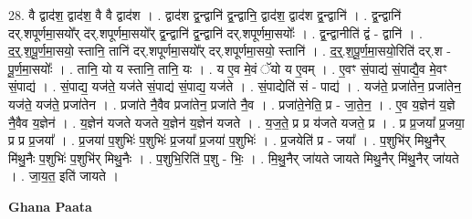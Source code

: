 \documentclass[17pt]{extarticle}
\begin{document}
28. वै द्वाद॑श॒ द्वाद॑श॒ वै वै द्वाद॑श । . द्वाद॑श द्व॒न्द्वानि॑ द्व॒न्द्वानि॒ द्वाद॑श॒ द्वाद॑श द्व॒न्द्वानि॑ । . द्व॒न्द्वानि॑ दर्.शपूर्णमा॒सयो᳚र् दर्.शपूर्णमा॒सयो᳚र् द्व॒न्द्वानि॑ द्व॒न्द्वानि॑ दर्.शपूर्णमा॒सयोः᳚ । . द्व॒न्द्वानीति॑ द्वं - द्वानि॑ । . द॒र्॒.श॒पू॒र्ण॒मा॒सयो॒ स्तानि॒ तानि॑ दर्.शपूर्णमा॒सयो᳚र् दर्.शपूर्णमा॒सयो॒ स्तानि॑ । . द॒र्॒.श॒पू॒र्ण॒मा॒सयो॒रिति॑ दर्.श - पू॒र्ण॒मा॒सयोः᳚ । . तानि॒ यो य स्तानि॒ तानि॒ यः । . य ए॒व मे॒वं ॅयो य ए॒वम् । . ए॒वꣳ सं॒पाद्य॑ सं॒पाद्यै॒व मे॒वꣳ सं॒पाद्य॑ । . सं॒पाद्य॒ यज॑ते॒ यज॑ते सं॒पाद्य॑ सं॒पाद्य॒ यज॑ते । . सं॒पाद्येति॑ सं - पाद्य॑ । . यज॑ते॒ प्रजा॑तेन॒ प्रजा॑तेन॒ यज॑ते॒ यज॑ते॒ प्रजा॑तेन । . प्रजा॑ते नै॒वैव प्रजा॑तेन॒ प्रजा॑ते नै॒व । . प्रजा॑ते॒नेति॒ प्र - जा॒ते॒न॒ । . ए॒व य॒ज्ञेन॑ य॒ज्ञे नै॒वैव य॒ज्ञेन॑ । . य॒ज्ञेन॑ यजते यजते य॒ज्ञेन॑ य॒ज्ञेन॑ यजते । . य॒ज॒ते॒ प्र प्र य॑जते यजते॒ प्र । . प्र प्र॒जया᳚ प्र॒जया॒ प्र प्र प्र॒जया᳚ । . प्र॒जया॑ प॒शुभिः॑ प॒शुभिः॑ प्र॒जया᳚ प्र॒जया॑ प॒शुभिः॑ । . प्र॒जयेति॑ प्र - जया᳚ । . प॒शुभि॑र् मिथु॒नैर् मि॑थु॒नैः प॒शुभिः॑ प॒शुभि॑र् मिथु॒नैः । . प॒शुभि॒रिति॑ प॒शु - भिः॒ । . मि॒थु॒नैर् जा॑यते जायते मिथु॒नैर् मि॑थु॒नैर् जा॑यते । . जा॒य॒त॒ इति॑ जायते । \newline

\textbf{Ghana Paata } \newline
\end{document}
